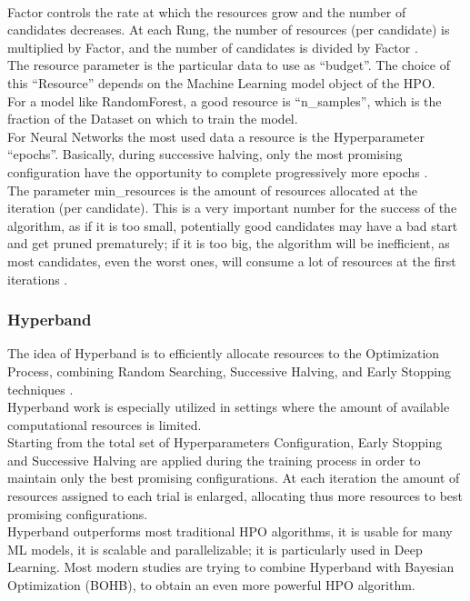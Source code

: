 \\[0.3cm]Factor controls the rate at which the resources grow and the number of candidates decreases.
At each Rung, the number of resources (per candidate) is multiplied by Factor, and the number of candidates is divided by Factor \cite{OptunaPruners-SuccessiveHalvingAlgorithm}.
% 
\\[0.3cm]The resource parameter is the particular data to use as “budget”.
The choice of this “Resource” depends on the Machine Learning model object of the HPO.
\\[0.3cm]For a model like RandomForest, a good resource is “n\_samples”, which is the fraction of the Dataset on which to train the model.
\\[0.3cm]For Neural Networks the most used data a resource is the Hyperparameter “epochs”. Basically, during successive halving, only the most promising configuration have the opportunity to complete progressively more epochs \cite{OptunaPruners-SuccessiveHalvingAlgorithm}.
% 
\\[0.3cm]The parameter min\_resources is the amount of resources allocated at the iteration (per candidate).
This is a very important number for the success of the algorithm, as if it is too small, potentially good candidates may have a bad start and get pruned prematurely; if it is too big, the algorithm will be inefficient, as most candidates, even the worst ones, will consume a lot of resources at the first iterations \cite{OptunaPruners-SuccessiveHalvingAlgorithm}.

\subsubsection{Hyperband}

The idea of Hyperband is to efficiently allocate resources to the Optimization Process, combining Random Searching, Successive Halving, and Early Stopping techniques \cite{OptunaPruners-Hyperband} \cite{Tesi-1.8}.
\\[0.3cm]Hyperband work is especially utilized in settings where the amount of available computational resources is limited.
\\[0.3cm]Starting from the total set of Hyperparameters Configuration, Early Stopping and Successive Halving are applied during the training process in order to maintain only the best promising configurations.
At each iteration the amount of resources assigned to each trial is enlarged, allocating thus more resources to best promising configurations.
\\[0.3cm]Hyperband outperforms most traditional HPO algorithms, it is usable for many ML models, it is scalable and parallelizable; it is particularly used in Deep Learning.
Most modern studies are trying to combine Hyperband with Bayesian Optimization (BOHB), to obtain an even more powerful HPO algorithm.

